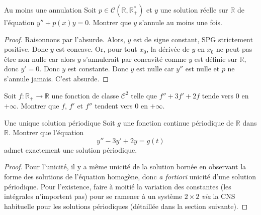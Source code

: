 \documentclass[french,a4paper]{article}
\newcommand{\R}{\mathbb{R}}
\newcommand{\st}{^*}
\theoremstyle{plain}
\theoremstyle{definition}
\theoremstyle{remark}
\begin{document}
\begin{ex}[Moulin.45]{Au moins une annulation}
	Soit $p\in\mathcal{C}(\R,\R_+\st)$ et $y$ une solution réelle sur $\R$ de l'équation $y''+p(x)y=0$. Montrer que $y$ s'annule au moins une fois.
\end{ex}
\begin{proof}
	Raisonnons par l'absurde. Alors, $y$ est de signe constant, SPG strictement positive. Donc $y$ est concave. Or, pour tout $x_0$, la dérivée de $y$ en $x_0$ ne peut pas être non nulle car alors $y$ s'annulerait par concavité comme $y$ est définie sur $\R$, donc $y'=0$. Donc $y$ est constante. Donc $y$ est nulle car $y''$ est nulle et $p$ ne s'annule jamais. C'est absurde.
\end{proof}

\begin{ex}[Moulin.46]{}
	Soit $f:\R_+\to\R$ une fonction de classe $\mathcal{C}^2$ telle que $f''+3f'+2f$ tende vers $0$ en $+\infty$. Montrer que $f$, $f'$ et $f''$ tendent vers $0$ en $+\infty$.
\end{ex}

\begin{ex}[Moulin.47]{Une unique solution périodique}
	Soit $g$ une fonction continue périodique de $\R$ dans $\R$. Montrer que l'équation $$y''-3y'+2y=g(t)$$ admet exactement une solution périodique.
\end{ex}
\begin{proof}
	Pour l'unicité, il y a même unicité de la solution bornée en observant la forme des solutions de l'équation homogène, donc \textit{a fortiori} unicité d'une solution périodique. Pour l'existence, faire à moitié la variation des constantes (les intégrales n'importent pas) pour se ramener à un système $2\times 2$ \textit{via} la CNS habituelle pour les solutions périodiques (détaillée dans la section suivante).
\end{proof}
\end{document}
